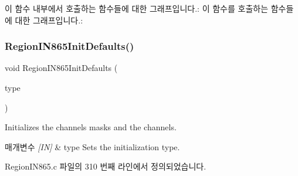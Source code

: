 이 함수 내부에서 호출하는 함수들에 대한 그래프입니다.\+:
이 함수를 호출하는 함수들에 대한 그래프입니다.\+:
\mbox{\label{group___r_e_g_i_o_n_i_n865_ga06d37a72380911c81768c31a4f0b6da7}} 
\subsubsection{\texorpdfstring{Region\+I\+N865\+Init\+Defaults()}{RegionIN865InitDefaults()}}
{\footnotesize\ttfamily void Region\+I\+N865\+Init\+Defaults (\begin{DoxyParamCaption}\item[{\mbox{\hyperlink{group___r_e_g_i_o_n_gaddc73ae10673ec925724e7870363bda9}{Init\+Type\+\_\+t}}}]{type }\end{DoxyParamCaption})}



Initializes the channels masks and the channels. 


\begin{DoxyParams}{매개변수}
{\em \mbox{[}\+I\+N\mbox{]}} & type Sets the initialization type. \\
\hline
\end{DoxyParams}


Region\+I\+N865.\+c 파일의 310 번째 라인에서 정의되었습니다.


